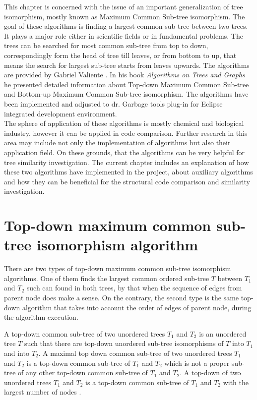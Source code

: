\documentclass{report}
\begin{document}
This chapter is concerned with the issue of an important generalization of tree isomorphism, mostly known as Maximum Common Sub-tree isomorphism. The goal of these algorithms is finding a largest common sub-tree between two trees. It plays a major role either in scientific fields or in fundamental problems. The trees can be searched for most common sub-tree from top to down, correspondingly form the head of tree till leaves, or from bottom to up, that means the search for largest sub-tree starts from leaves upwards. The algorithms are provided by Gabriel Valiente \cite{valiente}. In his book \emph{Algorithms on Trees and Graphs} he presented detailed information about Top-down Maximum Common Sub-tree and Bottom-up Maximum Common Sub-tree isomorphism. The algorithms have been implemented and adjusted to dr. Garbage tools plug-in for Eclipse integrated development environment.
\\
The sphere of application of these algorithms is mostly chemical and biological industry, however it can be applied in code comparison. Further research in this area may include not only the implementation of algorithms but also their application field. On these grounds, that the algorithms can be very helpful for tree similarity investigation. The current chapter includes an explanation of how these two algorithms have implemented in the project, about auxiliary algorithms and how they can be beneficial for the structural code comparison and similarity investigation.



\section{Top-down maximum common sub-tree isomorphism algorithm}
\label{sec:topdown}

There are two types of top-down maximum common sub-tree isomorphism algorithms. One of them finds the largest common ordered sub-tree $T$ between $ T_{1}$ and $ T_{2}$ such can found in both trees, by that when the sequence of edges from parent node does make a sense. On the contrary, the second type is the same top-down algorithm that takes into account the order of edges of parent node, during the algorithm execution. 

A top-down common sub-tree of two unordered trees $ T_{1}$ and $ T_{2 }$ is an unordered tree $T$ such that there are top-down unordered sub-tree isomorphisms of $ T$ into $ T_{1}$ and into $ T_{2}$. A maximal top down common sub-tree of two unordered  trees $ T_{1}$ and $ T_{2}$ is a top-down common sub-tree of $ T_{1}$ and $ T_{2}$ which is not a proper sub-tree of any other top-down common sub-tree of $ T_{1}$ and $ T_{2}$. A top-down of two unordered trees $ T_{1}$ and $ T_{2}$ is a top-down common sub-tree of $ T_{1}$ and $ T_{2}$ with the largest number of nodes \cite{valiente}.
\end{document}
